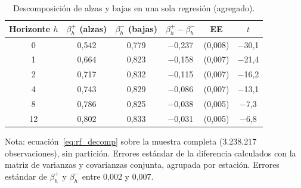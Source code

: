 \documentclass[11pt]{article}
\begin{document}
\begin{table}[htbp]
\centering
\caption{Descomposición de alzas y bajas en una sola regresión (agregado).}
\label{tab:rf_decomp}
\begin{tabular}{cccccc}
\toprule
Horizonte $h$ & $\beta_h^{+}$ (alzas) & $\beta_h^{-}$ (bajas) &
$\beta_h^{+} - \beta_h^{-}$ & EE & $t$ \\
\midrule
0  & 0,542 & 0,779 & $-$0,237 & (0,008) & $-$30,1 \\
1  & 0,664 & 0,823 & $-$0,158 & (0,007) & $-$21,4 \\
2  & 0,717 & 0,832 & $-$0,115 & (0,007) & $-$16,2 \\
4  & 0,743 & 0,829 & $-$0,086 & (0,007) & $-$13,1 \\
8  & 0,786 & 0,825 & $-$0,038 & (0,005) & $-$7,3 \\
12 & 0,802 & 0,833 & $-$0,031 & (0,005) & $-$6,8 \\
\bottomrule
\end{tabular}

\medskip
\begin{minipage}{0.92\textwidth}
\footnotesize
Nota: ecuación~\eqref{eq:rf_decomp} sobre la muestra completa (3.238.217
observaciones), sin partición. Errores estándar de la diferencia calculados
con la matriz de varianzas y covarianzas conjunta, agrupada por estación.
Errores estándar de $\beta_h^{+}$ y $\beta_h^{-}$ entre 0,002 y 0,007.
\end{minipage}
\end{table}
\end{document}
